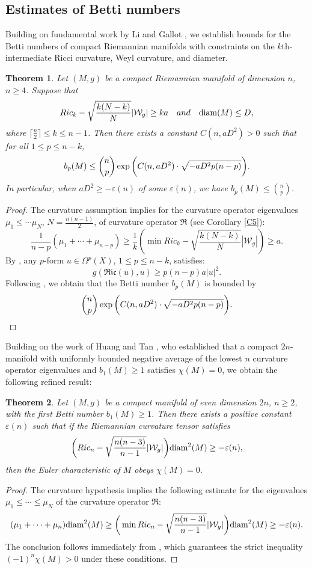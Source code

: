 \documentclass[12pt, twoside]{article}
\newtheorem{theorem}{Theorem}[section]
\theoremstyle{definition}
\numberwithin{equation}{section}
\def\Om{\Omega}
\begin{document}
\subsection{Estimates of Betti numbers }
Building on fundamental work by Li \cite{Li80} and Gallot \cite{Gal81}, we establish bounds for the Betti numbers of compact Riemannian manifolds with constraints on the $k$th-intermediate Ricci curvature, Weyl curvature, and diameter.
\begin{theorem}
Let $(M,g)$ be a compact Riemannian manifold of dimension $n$, $n\geq4$.  Suppose that 
	$$Ric_{k}-\sqrt{\frac{k(N-k)}{N}}|\mathcal{W}_{g}|\geq ka\quad and\quad {\rm{diam}}(M)\leq D,$$	
	where $\lceil\frac{n}{2} \rceil\leq k\leq n-1$. Then there exists a constant $C(n,aD^{2})>0$ such that for all $1\leq p\leq n-k$,
	$$b_{p}(M)\leq {\binom{n}{p}}\exp\bigg{(}C(n,aD^{2})\cdot\sqrt{-aD^{2}p(n-p)}\bigg{)}.$$
	In particular, when $aD^{2}\geq-\varepsilon(n)$ of some $\varepsilon(n)$, we have $b_{p}(M)\leq {\binom{n}{p}}$. 
\end{theorem}
\begin{proof}
	The curvature assumption implies for the curvature operator eigenvalues  $\mu_{1}\leq\cdots \mu_{N}$, $N=\frac{n(n-1)}{2}$, of curvature operator $\mathfrak{R}$ (see Corollary \ref{C5}): 
	$$\frac{1}{n-p}(\mu_{1}+\cdots+\mu_{n-p})\geq\frac{1}{k}(\min Ric_{k}-\sqrt{\frac{k(N-k)}{N}}|\mathcal{W}_{g}|)\geq a.$$
	By \cite[Lemma 2.1]{PW21a},  any $p$-form $u\in\Om^{p}(X)$, $1\leq p\leq n-k$, satisfies:
	$$g(\mathfrak{Ric}(u),u)\geq p(n-p)a|u|^2.$$
	Following \cite[Theorem 1.9]{PW21a}, we obtain that the Betti number $b_{p}(M)$ is bounded by $${\binom{n}{p}}\exp\bigg{(}C(n,aD^{2})\cdot\sqrt{-aD^{2}p(n-p)}\bigg{)}.$$
\end{proof}
Building on the work of Huang and Tan \cite{HT25}, who established that a compact $2n$-manifold with uniformly bounded negative average of the lowest $n$ curvature operator eigenvalues and $b_1(M) \geq 1$ satisfies $\chi(M)=0$, we obtain the following refined result:
\begin{theorem}
	Let $(M,g)$ be a compact manifold of even dimension $2n$, $n\geq2$, with the first Betti number $b_{1}(M)\geq1$. Then there exists a positive constant $\varepsilon(n)$ such that if the Riemannian curvature tensor satisfies
	$$\bigg{(} Ric_{n}-\sqrt{\frac{n(n-3)}{n-1}  }|\mathcal{W}_{g}|\bigg{)}{\rm{diam}}^{2}(M)\geq-\varepsilon(n),$$
	then the Euler characteristic of $M$ obeys $\chi(M)=0$.    
\end{theorem} 
\begin{proof}
The curvature hypothesis implies the following estimate for the eigenvalues  $\mu_1\leq\cdots\leq\mu_{N}$ of the curvature operator $\mathfrak{R}$:
	$$(\mu_{1}+\cdots+\mu_{n}){\rm{diam}}^{2}(M)\geq\bigg{(}\min Ric_{n}-\sqrt{\frac{n(n-3)}{n-1}  }|\mathcal{W}_{g}|\bigg{)}{\rm{diam}}^{2}(M)\geq-\varepsilon(n).$$
The conclusion follows immediately from \cite[Theorem 1.1]{HT25}, which guarantees the strict inequality $(-1)^n\chi(M) > 0$ under these conditions.
	
\end{proof}
\end{document}
